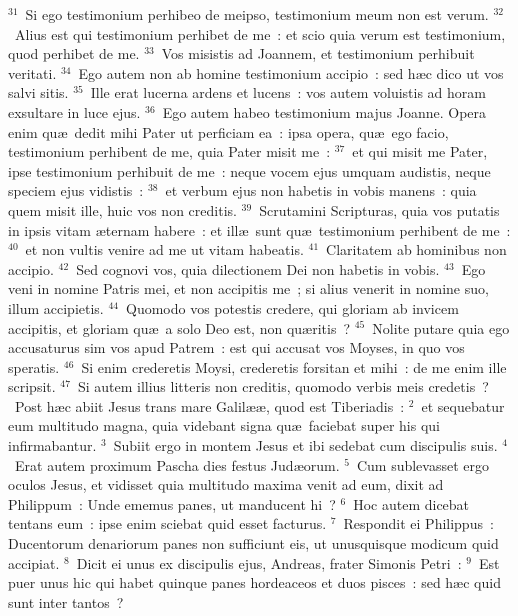 ${}^{31}$~Si ego testimonium perhibeo de meipso, testimonium meum non est verum.
${}^{32}$~Alius est qui testimonium perhibet de me~: et scio quia verum est testimonium, quod perhibet de me.
${}^{33}$~Vos misistis ad Joannem, et testimonium perhibuit veritati.
${}^{34}$~Ego autem non ab homine testimonium accipio~: sed h\ae c dico ut vos salvi sitis.
${}^{35}$~Ille erat lucerna ardens et lucens~: vos autem voluistis ad horam exsultare in luce ejus.
${}^{36}$~Ego autem habeo testimonium majus Joanne. Opera enim qu\ae\ dedit mihi Pater ut perficiam ea~: ipsa opera, qu\ae\ ego facio, testimonium perhibent de me, quia Pater misit me~:
${}^{37}$~et qui misit me Pater, ipse testimonium perhibuit de me~: neque vocem ejus umquam audistis, neque speciem ejus vidistis~:
${}^{38}$~et verbum ejus non habetis in vobis manens~: quia quem misit ille, huic vos non creditis.
${}^{39}$~Scrutamini Scripturas, quia vos putatis in ipsis vitam \ae ternam habere~: et ill\ae\ sunt qu\ae\ testimonium perhibent de me~:
${}^{40}$~et non vultis venire ad me ut vitam habeatis.
${}^{41}$~Claritatem ab hominibus non accipio.
${}^{42}$~Sed cognovi vos, quia dilectionem Dei non habetis in vobis.
${}^{43}$~Ego veni in nomine Patris mei, et non accipitis me~; si alius venerit in nomine suo, illum accipietis.
${}^{44}$~Quomodo vos potestis credere, qui gloriam ab invicem accipitis, et gloriam qu\ae\ a solo Deo est, non qu\ae ritis~?
${}^{45}$~Nolite putare quia ego accusaturus sim vos apud Patrem~: est qui accusat vos Moyses, in quo vos speratis.
${}^{46}$~Si enim crederetis Moysi, crederetis forsitan et mihi~: de me enim ille scripsit.
${}^{47}$~Si autem illius litteris non creditis, quomodo verbis meis credetis~?
~Post h\ae c abiit Jesus trans mare Galil\ae \ae , quod est Tiberiadis~:
${}^{2}$~et sequebatur eum multitudo magna, quia videbant signa qu\ae\ faciebat super his qui infirmabantur.
${}^{3}$~Subiit ergo in montem Jesus et ibi sedebat cum discipulis suis.
${}^{4}$~Erat autem proximum Pascha dies festus Jud\ae orum.
${}^{5}$~Cum sublevasset ergo oculos Jesus, et vidisset quia multitudo maxima venit ad eum, dixit ad Philippum~: Unde ememus panes, ut manducent hi~?
${}^{6}$~Hoc autem dicebat tentans eum~: ipse enim sciebat quid esset facturus.
${}^{7}$~Respondit ei Philippus~: Ducentorum denariorum panes non sufficiunt eis, ut unusquisque modicum quid accipiat.
${}^{8}$~Dicit ei unus ex discipulis ejus, Andreas, frater Simonis Petri~:
${}^{9}$~Est puer unus hic qui habet quinque panes hordeaceos et duos pisces~: sed h\ae c quid sunt inter tantos~?
